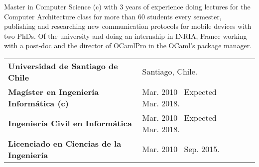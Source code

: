 \documentclass[10pt,letterpaper]{article}
\begin{document}
	

	\noindent Master in Computer Science (c) with 3 years of experience doing lectures for the Computer Architecture class for more than 60 students every semester, publishing and researching new communication protocols for mobile devices with two PhDs. Of the university and doing an internship in INRIA, France working with a post-doc and the director of OCamlPro in the OCaml's package manager.

	\vspace{\separationAfterHeaderBeforeItem}
	\vspace{\separationAfterHeader}
	\hspace{\hseparationBeforeTabular}
	\begin{tabular}[t]{llll}
		\textbf{Universidad de Santiago de Chile} & Santiago, Chile.& & \\
		\textbullet\hspace{0.4em}\textbf{Magíster en Ingeniería Informática (c)}& Mar. 2010 \textendash  \ Expected Mar. 2018. &\\ [0em]
		\textbullet\hspace{0.4em}\textbf{Ingeniería Civil en Informática} & Mar. 2010 \textendash \  Expected Mar. 2018. &\\ [0em]
		\textbullet\hspace{0.4em}\textbf{Licenciado en Ciencias de la Ingeniería} & Mar. 2010 \textendash \  Sep. 2015. &\\
	\end{tabular}
\end{document}
